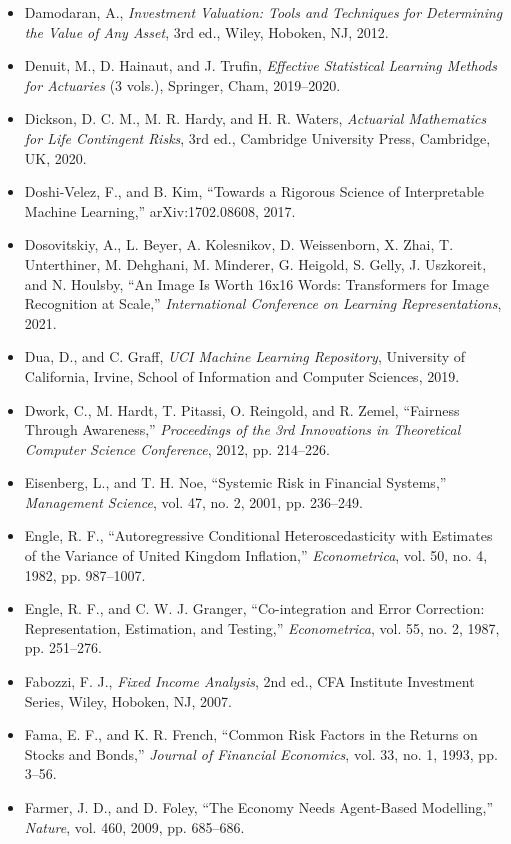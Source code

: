 \documentclass{book}
\begin{document}
\begin{itemize}
    \item Damodaran, A., \emph{Investment Valuation: Tools and Techniques for Determining the Value of Any Asset}, 3rd ed., Wiley, Hoboken, NJ, 2012.
    \item Denuit, M., D. Hainaut, and J. Trufin, \emph{Effective Statistical Learning Methods for Actuaries} (3 vols.), Springer, Cham, 2019--2020.
    \item Dickson, D. C. M., M. R. Hardy, and H. R. Waters, \emph{Actuarial Mathematics for Life Contingent Risks}, 3rd ed., Cambridge University Press, Cambridge, UK, 2020.
    \item Doshi-Velez, F., and B. Kim, ``Towards a Rigorous Science of Interpretable Machine Learning,'' arXiv:1702.08608, 2017.
    \item Dosovitskiy, A., L. Beyer, A. Kolesnikov, D. Weissenborn, X. Zhai, T. Unterthiner, M. Dehghani, M. Minderer, G. Heigold, S. Gelly, J. Uszkoreit, and N. Houlsby, ``An Image Is Worth 16x16 Words: Transformers for Image Recognition at Scale,'' \emph{International Conference on Learning Representations}, 2021.
    \item Dua, D., and C. Graff, \emph{UCI Machine Learning Repository}, University of California, Irvine, School of Information and Computer Sciences, 2019.
    \item Dwork, C., M. Hardt, T. Pitassi, O. Reingold, and R. Zemel, ``Fairness Through Awareness,'' \emph{Proceedings of the 3rd Innovations in Theoretical Computer Science Conference}, 2012, pp. 214--226.
    \item Eisenberg, L., and T. H. Noe, ``Systemic Risk in Financial Systems,'' \emph{Management Science}, vol. 47, no. 2, 2001, pp. 236--249.
    \item Engle, R. F., ``Autoregressive Conditional Heteroscedasticity with Estimates of the Variance of United Kingdom Inflation,'' \emph{Econometrica}, vol. 50, no. 4, 1982, pp. 987--1007.
    \item Engle, R. F., and C. W. J. Granger, ``Co-integration and Error Correction: Representation, Estimation, and Testing,'' \emph{Econometrica}, vol. 55, no. 2, 1987, pp. 251--276.
    \item Fabozzi, F. J., \emph{Fixed Income Analysis}, 2nd ed., CFA Institute Investment Series, Wiley, Hoboken, NJ, 2007.
    \item Fama, E. F., and K. R. French, ``Common Risk Factors in the Returns on Stocks and Bonds,'' \emph{Journal of Financial Economics}, vol. 33, no. 1, 1993, pp. 3--56.
    \item Farmer, J. D., and D. Foley, ``The Economy Needs Agent-Based Modelling,'' \emph{Nature}, vol. 460, 2009, pp. 685--686.

\end{itemize}
\end{document}
